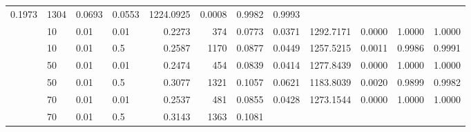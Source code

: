 \begin{table}[H]
{\begin{tabular}{llllrrrrrrrr}
\color[HTML]{000000} 0.1973 & {\cellcolor[HTML]{0E0EFE}} \color[HTML]{F1F1F1} 1304 & {\cellcolor[HTML]{F0F0F3}} \color[HTML]{000000} 0.0693 & {\cellcolor[HTML]{5656FB}} \color[HTML]{F1F1F1} 0.0553 & {\cellcolor[HTML]{8989F8}} \color[HTML]{F1F1F1} 1224.0925 & {\cellcolor[HTML]{A7A7F7}} \color[HTML]{000000} 0.0008 & {\cellcolor[HTML]{1E1EFD}} \color[HTML]{F1F1F1} 0.9982 & {\cellcolor[HTML]{4C4CFB}} \color[HTML]{F1F1F1} 0.9993 \\ & 10 & 0.01 & 0.01 & {\cellcolor[HTML]{B3B3F6}} \color[HTML]{000000} 0.2273 & {\cellcolor[HTML]{EFEFF3}} \color[HTML]{000000} 374 & {\cellcolor[HTML]{BFBFF5}} \color[HTML]{000000} 0.0773 & {\cellcolor[HTML]{EBEBF3}} \color[HTML]{000000} 0.0371 & {\cellcolor[HTML]{0505FF}} \color[HTML]{F1F1F1} 1292.7171 & {\cellcolor[HTML]{F0F0F3}} \color[HTML]{000000} 0.0000 & {\cellcolor[HTML]{0000FF}} \color[HTML]{F1F1F1} 1.0000 & {\cellcolor[HTML]{0000FF}} \color[HTML]{F1F1F1} 1.0000 \\& 10 & 0.01 & 0.5 & {\cellcolor[HTML]{7272F9}} \color[HTML]{F1F1F1} 0.2587 & {\cellcolor[HTML]{2E2EFD}} \color[HTML]{F1F1F1} 1170 & {\cellcolor[HTML]{7E7EF9}} \color[HTML]{F1F1F1} 0.0877 & {\cellcolor[HTML]{ACACF6}} \color[HTML]{000000} 0.0449 & {\cellcolor[HTML]{4949FB}} \color[HTML]{F1F1F1} 1257.5215 & {\cellcolor[HTML]{8B8BF8}} \color[HTML]{F1F1F1} 0.0011 & {\cellcolor[HTML]{1818FE}} \color[HTML]{F1F1F1} 0.9986 & {\cellcolor[HTML]{6262FA}} \color[HTML]{F1F1F1} 0.9991 \\ & 50 & 0.01 & 0.01 & {\cellcolor[HTML]{8A8AF8}} \color[HTML]{F1F1F1} 0.2474 & {\cellcolor[HTML]{DDDDF4}} \color[HTML]{000000} 454 & {\cellcolor[HTML]{9696F7}} \color[HTML]{F1F1F1} 0.0839 & {\cellcolor[HTML]{C8C8F5}} \color[HTML]{000000} 0.0414 & {\cellcolor[HTML]{2121FD}} \color[HTML]{F1F1F1} 1277.8439 & {\cellcolor[HTML]{F0F0F3}} \color[HTML]{000000} 0.0000 & {\cellcolor[HTML]{0000FF}} \color[HTML]{F1F1F1} 1.0000 & {\cellcolor[HTML]{0000FF}} \color[HTML]{F1F1F1} 1.0000 \\ & 50 & 0.01 & 0.5 & {\cellcolor[HTML]{0D0DFE}} \color[HTML]{F1F1F1} 0.3077 & {\cellcolor[HTML]{0909FF}} \color[HTML]{F1F1F1} 1321 & {\cellcolor[HTML]{0E0EFE}} \color[HTML]{F1F1F1} 0.1057 & {\cellcolor[HTML]{1E1EFD}} \color[HTML]{F1F1F1} 0.0621 & {\cellcolor[HTML]{D6D6F4}} \color[HTML]{000000} 1183.8039 & {\cellcolor[HTML]{3838FC}} \color[HTML]{F1F1F1} 0.0020 & {\cellcolor[HTML]{ACACF6}} \color[HTML]{000000} 0.9899 & {\cellcolor[HTML]{C5C5F5}} \color[HTML]{000000} 0.9982 \\ & 70 & 0.01 & 0.01 & {\cellcolor[HTML]{7C7CF9}} \color[HTML]{F1F1F1} 0.2537 & {\cellcolor[HTML]{D6D6F4}} \color[HTML]{000000} 481 & {\cellcolor[HTML]{8C8CF8}} \color[HTML]{F1F1F1} 0.0855 & {\cellcolor[HTML]{BDBDF5}} \color[HTML]{000000} 0.0428 & {\cellcolor[HTML]{2A2AFD}} \color[HTML]{F1F1F1} 1273.1544 & {\cellcolor[HTML]{F0F0F3}} \color[HTML]{000000} 0.0000 & {\cellcolor[HTML]{0000FF}} \color[HTML]{F1F1F1} 1.0000 & {\cellcolor[HTML]{0000FF}} \color[HTML]{F1F1F1} 1.0000 \\ & 70 & 0.01 & 0.5 & {\cellcolor[HTML]{0000FF}} \color[HTML]{F1F1F1} 0.3143 & {\cellcolor[HTML]{0000FF}} \color[HTML]{F1F1F1} 1363 & {\cellcolor[HTML]{0000FF}} \color[HTML]{F1F1F1} 0.1081 & {\cellcolor[HTML]{0000FF}} 
\end{tabular}}
\end{table}
